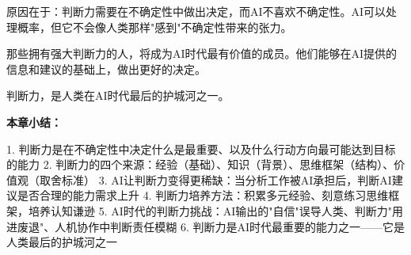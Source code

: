 原因在于：判断力需要在不确定性中做出决定，而AI不喜欢不确定性。AI可以处理概率，但它不会像人类那样"感到"不确定性带来的张力。

那些拥有强大判断力的人，将成为AI时代最有价值的成员。他们能够在AI提供的信息和建议的基础上，做出更好的决定。

判断力，是人类在AI时代最后的护城河之一。


\textbf{本章小结：}

1. 判断力是在不确定性中决定什么是最重要、以及什么行动方向最可能达到目标的能力
2. 判断力的四个来源：经验（基础）、知识（背景）、思维框架（结构）、价值观（取舍标准）
3. AI让判断力变得更稀缺：当分析工作被AI承担后，判断AI建议是否合理的能力需求上升
4. 判断力培养方法：积累多元经验、刻意练习思维框架，培养认知谦逊
5. AI时代的判断力挑战：AI输出的"自信"误导人类、判断力"用进废退"、人机协作中判断责任模糊
6. 判断力是AI时代最重要的能力之一——它是人类最后的护城河之一
